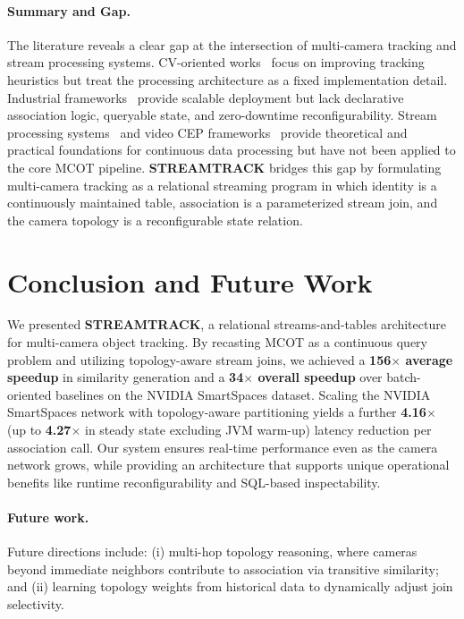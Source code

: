 \documentclass[11pt]{article}
\begin{document}
\paragraph{Summary and Gap.}
The literature reveals a clear gap at the intersection of multi-camera tracking and stream processing systems. CV-oriented works~\cite{yoshida2024overlap,kim2024cluster,xie2024robust,specker2024ocmctrack,yang2024online} focus on improving tracking heuristics but treat the processing architecture as a fixed implementation detail. Industrial frameworks~\cite{nvidia2024deepstream,nvidia2025metropolis} provide scalable deployment but lack declarative association logic, queryable state, and zero-downtime reconfigurability. Stream processing systems~\cite{sax2018streams,carbone2015flink,kreps2011kafka} and video CEP frameworks~\cite{yadav2019vidcep} provide theoretical and practical foundations for continuous data processing but have not been applied to the core MCOT pipeline. \textbf{STREAMTRACK} bridges this gap by formulating multi-camera tracking as a relational streaming program in which identity is a continuously maintained table, association is a parameterized stream join, and the camera topology is a reconfigurable state relation.

\section{Conclusion and Future Work}\label{sec:conclusion}
We presented \textbf{STREAMTRACK}, a relational streams-and-tables architecture for multi-camera object tracking. By recasting MCOT as a continuous query problem and utilizing topology-aware stream joins, we achieved a \textbf{156$\times$ average speedup} in similarity generation and a \textbf{34$\times$ overall speedup} over batch-oriented baselines on the NVIDIA SmartSpaces dataset. Scaling the NVIDIA SmartSpaces network with topology-aware partitioning yields a further \textbf{4.16$\times$} (up to \textbf{4.27$\times$} in steady state excluding JVM warm-up) latency reduction per association call. Our system ensures real-time performance even as the camera network grows, while providing an architecture that supports unique operational benefits like runtime reconfigurability and SQL-based inspectability.

\paragraph{Future work.}
Future directions include: (i) multi-hop topology reasoning, where cameras beyond immediate neighbors contribute to association via transitive similarity; and (ii) learning topology weights from historical data to dynamically adjust join selectivity.



\end{document}
